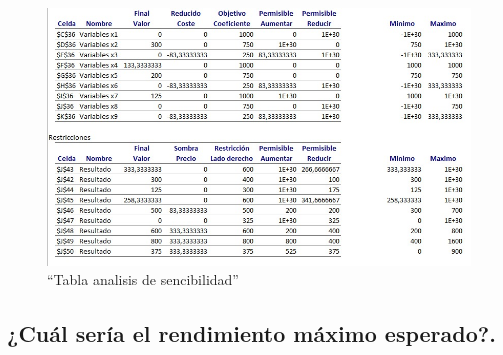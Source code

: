 \documentclass[
]{article}
\begin{document}
\begin{figure}
\centering
\includegraphics{analisis.jpeg}
\caption{``Tabla analisis de sencibilidad''}
\end{figure}

\hypertarget{cuuxe1l-seruxeda-el-rendimiento-muxe1ximo-esperado.}{%
\subsection{¿Cuál sería el rendimiento máximo
esperado?.}\label{cuuxe1l-seruxeda-el-rendimiento-muxe1ximo-esperado.}}
\end{document}
